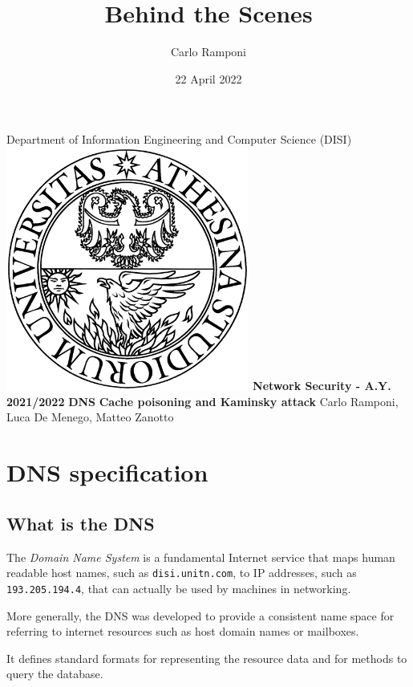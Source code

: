 \documentclass[11pt,a4paper]{article}
\title{Behind the Scenes}
\author{Carlo Ramponi}
\date{22 April 2022}
\begin{document}
\begin{titlepage}

\centering
    \vfill
    \vskip3cm
    \Large Department of Information Engineering and Computer Science
    \vskip0.5cm
    \Large (DISI)
    \vskip2cm
    \includegraphics[width=8cm]{logo_unitn.png}
    \vskip2cm
    \textbf{\Large Network Security - A.Y. 2021/2022}
    \vskip2cm
    \textbf{\LARGE DNS}
    \vskip0.2cm
    \textbf{\LARGE Cache poisoning and Kaminsky attack}
    \vskip4cm
    \Large Carlo Ramponi, Luca De Menego, Matteo Zanotto
    \vfill

\end{titlepage}

\clearpage

\tableofcontents

\clearpage

\section{DNS specification}

\subsection{What is the DNS}

The \emph{Domain Name System} is a fundamental Internet service that maps human readable host names, such as \texttt{disi.unitn.com}, to IP addresses, such as \texttt{193.205.194.4}, that can actually be used by machines in networking.

\noindent
More generally, the DNS was developed to provide a consistent name space for referring to internet resources such as host domain names or mailboxes.

\noindent
It defines standard formats for representing the resource data and for methods to query the database.
\end{document}
